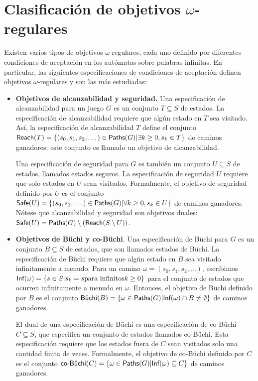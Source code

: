 \section{Clasificación de objetivos $\omega$-regulares}

Existen varios tipos de objetivos $\omega$-regulares, cada uno definido por
diferentes condiciones de aceptación en los autómatas sobre palabras infinitas.
En particular, las siguientes especificaciones de condiciones de aceptación
definen objetivos $\omega$-regulares y son las más estudiadas:

\begin{itemize}
	\item \textbf{Objetivos de alcanzabilidad y seguridad.} Una especificación de alcanzabilidad para un juego $G$ es un conjunto $T \subseteq S$ de estados. La especificación de alcanzabilidad requiere que algún estado en $T$ sea visitado. Así, la especificación de alcanzabilidad $T$ define el conjunto $\Reach(T) = \{(s_0, s_1, s_2, \dots) \in \Paths(G) | \exists k \geq 0, s_k \in T\}$ de caminos ganadores; este conjunto es llamado un objetivo de alcanzabilidad.

	      Una especificación de seguridad para $G$ es también un conjunto $U \subseteq S$
	      de estados, llamados estados seguros. La especificación de seguridad $U$
	      requiere que solo estados en $U$ sean visitados. Formalmente, el objetivo de
	      seguridad definido por $U$ es el conjunto $\Safe(U) = \{(s_0, s_1, \dots) \in
		      \Paths(G) | \forall k \geq 0, s_k \in U\}$ de caminos ganadores. Nótese que
	      alcanzabilidad y seguridad son objetivos duales: $\Safe(U) = \Paths(G)
		      \setminus (\Reach(S \setminus U))$.

	\item \textbf{Objetivos de Büchi y co-Büchi}. Una especificación de Büchi para $G$ es un conjunto $B \subseteq S$ de estados, que son llamados estados de Büchi. La especificación de Büchi requiere que algún estado en $B$ sea visitado infinitamente a menudo. Para un camino $\omega = (s_0, s_1, s_2, \dots)$, escribimos $\Inf(\omega) = \{s \in S | s_k = s \text{para infinitos} k \geq 0\}$ para el conjunto de estados que ocurren infinitamente a menudo en $\omega$. Entonces, el objetivo de Büchi definido por $B$ es el conjunto $\Buchi(B) = \{\omega \in \Paths(G) | \Inf(\omega) \cap B \neq \emptyset\}$ de caminos ganadores.

	      El dual de una especificación de Büchi es una especificación de co-Büchi $C
		      \subseteq S$, que especifica un conjunto de estados llamados co-Büchi. Esta
	      especificación requiere que los estados fuera de $C$ sean visitados solo una
	      cantidad finita de veces. Formalmente, el objetivo de co-Büchi definido por $C$
	      es el conjunto $\coBuchi(C) = \{\omega \in \Paths(G) | \Inf (\omega) \subseteq
		      C\}$ de caminos ganadores.


\end{itemize}
